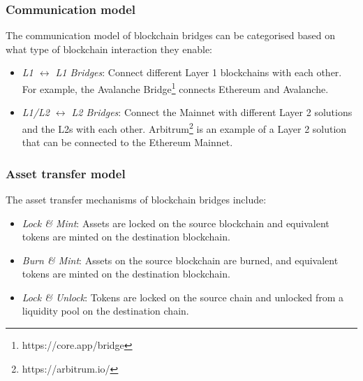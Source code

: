 \subsubsection{Communication model}
\label{subsubsec:communication_model}

The communication model of blockchain bridges can be categorised based on what type of blockchain interaction they enable:  \cite{lifi-bridge}
\begin{itemize}
    \item \textit{L1 $\leftrightarrow$ L1 Bridges}: Connect different Layer 1 blockchains with each other. For example, the Avalanche Bridge\footnote{https://core.app/bridge} connects Ethereum and Avalanche.
    \item \textit{L1/L2 $\leftrightarrow$ L2 Bridges}: Connect the Mainnet with different Layer 2 solutions and the L2s with each other. Arbitrum\footnote{https://arbitrum.io/} is an example of a Layer 2 solution that can be connected to the Ethereum Mainnet.
\end{itemize}

\subsubsection{Asset transfer model}
\label{subsubsec:asset_transfer_model}

The asset transfer mechanisms of blockchain bridges include:  \cite{lifi-bridge}  \cite{chainlink-transfer-assets}
\begin{itemize}
    \item \textit{Lock \& Mint}: Assets are locked on the source blockchain and equivalent tokens are minted on the destination blockchain. 
    \item \textit{Burn \& Mint}: Assets on the source blockchain are burned, and equivalent tokens are minted on the destination blockchain.  
    \item \textit{Lock \& Unlock}: Tokens are locked on the source chain and unlocked from a liquidity pool on the destination chain. 
\end{itemize}



